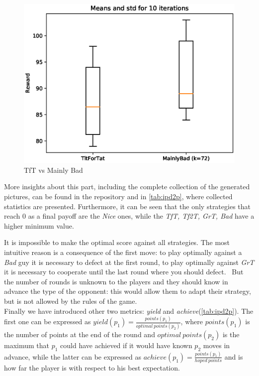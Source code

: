 \documentclass[journal,a4paper,10pt,twoside]{IEEEtran} %
\begin{document}
\begin{figure}[!ht]
    \centering
    \includegraphics[width=1\columnwidth]{../img/ipd2p/ipd2p-boxplot-TitForTat-MainlyBad(k=72)}
    \caption{TfT vs Mainly Bad}
    \label{fig:boxmbvtft}
\end{figure}

More insights about this part, including the complete collection of the generated pictures, can be found in the repository and in \autoref{tab:ipd2p}, where collected statistics are presented.
Furthermore, it can be seen that the only strategies that reach $0$ as a final payoff are the \textit{Nice} ones, while the \textit{TfT, Tf2T, GrT, Bad} have a higher minimum value.

It is impossible to make the optimal score against all strategies. The most intuitive reason is a consequence of the first move: to play optimally against a \textit{Bad} guy it is necessary to defect at the first round, to play optimally against \textit{GrT} it is necessary to cooperate until the last round where you should defect.~\cite{mathieu2017}
But the number of rounds is unknown to the players and they should know in advance the type of the opponent: this would allow them to adapt their strategy, but is not allowed by the rules of the game. 
\\
Finally we have introduced other two metrics: \textit{yield} and \textit{achieve}(\autoref{tab:ipd2p}). The first one can be expressed as $yield(p_1) = \frac{points(p_1)}{optimal\ points(p_2)}$, where $points(p_1)$ is the number of points at the end of the round and $optimal\ points(p_2)$ is the maximum that $p_1$ could have achieved if it would have known $p_2$ moves in advance, while the latter can be expressed as $achieve(p_1) = \frac{points(p_1)}{hoped\ points}$ and is how far the player is with respect to his best expectation.
\end{document}
